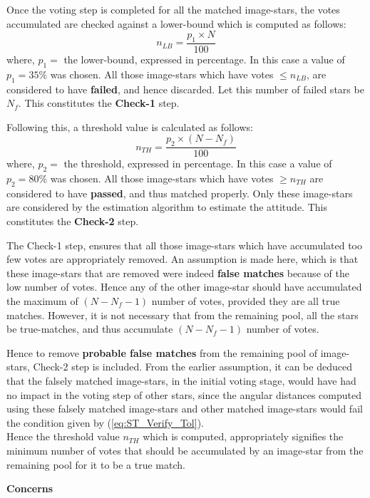 \documentclass[../../main.tex]{subfiles}
\begin{document}
Once the voting step is completed for all the matched image-stars, the votes accumulated are checked against a lower-bound which is computed as follows:
\begin{equation}
    n_{LB} = \frac{p_1 \times N}{100}
\end{equation}
where, $p_1=$ the lower-bound, expressed in percentage. In this case a value of $p_1=35\%$ was chosen. 
All those image-stars which have votes $\le n_{LB}$, are considered to have \textbf{failed}, and hence discarded. Let this number of failed stars be $N_f$.
This constitutes the \textbf{Check-1} step.

Following this, a threshold value is calculated as follows:
\begin{equation}
    n_{TH} = \frac{p_2 \times (N - N_f)}{100}
\end{equation}
where, $p_2=$ the threshold, expressed in percentage. In this case a value of $p_2=80\%$ was chosen. All those image-stars which have votes $\ge n_{TH}$ are considered to have \textbf{passed}, and thus matched properly. 
Only these image-stars are considered by the estimation algorithm to estimate the attitude.
This constitutes the \textbf{Check-2} step.

The Check-1 step, ensures that all those image-stars which have accumulated too few votes are appropriately removed. 
An assumption is made here, which is that these image-stars that are removed were indeed \textbf{false matches} because of the low number of votes.
Hence any of the other image-star should have accumulated the maximum of $(N-N_f-1)$ number of votes, provided they are all true matches. 
However, it is not necessary that from the remaining pool, all the stars be true-matches, and thus accumulate $(N-N_f-1)$ number of votes.

Hence to remove \textbf{probable false matches} from the remaining pool of image-stars, Check-2 step is included.
From the earlier assumption, it can be deduced that the falsely matched image-stars, in the initial voting stage, would have had no impact in the voting step of other stars, since the angular distances computed using these falsely matched image-stars and other matched image-stars would fail the condition given by (\ref{eq:ST_Verify_Tol}). \\
Hence the threshold value $n_{TH}$ which is computed, appropriately signifies the minimum number of votes that should be accumulated by an image-star from the remaining pool for it to be a true match.

\textbf{Concerns}
\end{document}
